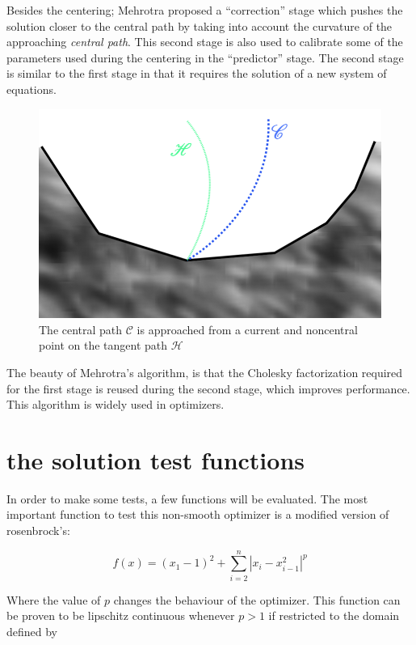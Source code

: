 Besides the centering; Mehrotra proposed a ``correction'' stage which pushes the solution closer to the central path by taking into account the curvature of the approaching \emph{central path}. This second stage is also used to calibrate some of the parameters used during the centering in the ``predictor'' stage. The second stage is similar to the first stage in that it requires the solution of a new system of equations.

\begin{figure}
\begin{center}
\includegraphics[scale=0.3]{Figures/CentralPath.png}
\caption{The central path $\mathcal{C}$ is approached from a current and noncentral point on the tangent path $\mathcal{H}$}
\end{center}
\end{figure}

The beauty of Mehrotra's algorithm, is that the Cholesky factorization required for the first stage is reused during the second stage, which improves performance.  This algorithm is widely used in optimizers.

\chapter{the solution test functions}

In order to make some tests, a few functions will be evaluated. The most important function to test this non-smooth optimizer is a modified version of rosenbrock's:

\begin{equation}
    f(x) = (x_1 - 1)^2 + \sum_{i = 2}^n |x_i - x_{i - 1}^2|^p
\end{equation}

Where the value of $p$ changes the behaviour of the optimizer. This function can be proven to be lipschitz continuous whenever $p > 1$ if restricted to the domain defined by  

